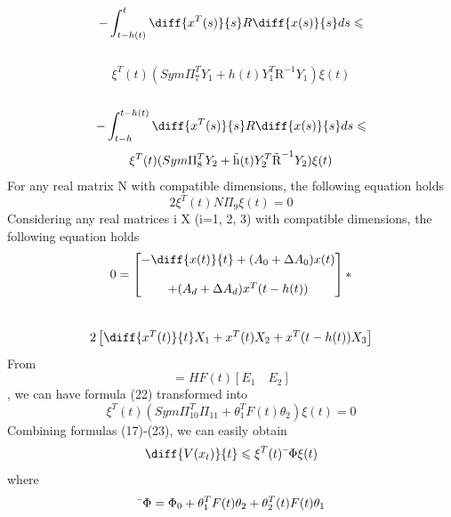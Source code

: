 \documentclass[journal]{IEEEtran}
\begin{document}
\begin{equation}
 -\int^{t}_{t-h(t)}\diff{x^T(s)}{s}R\diff{x(s)}{s}ds \leqslant 
\end{equation}
\\
\begin{equation}
\xi ^T (t)(Sym{\Pi^{T}_{7}Y_1} + h(t)Y^{T}_{1}\text{\~{R}}^{-1}Y_1)\xi (t)
\end{equation}
\\
\begin{equation}
-\int^{t-h(t)}_{t-h}\diff{x^T(s)}{s}R\diff{x(s)}{s}ds \leqslant 
\end{equation}
\begin{equation}
\xi ^T (t)(Sym{\Pi^{T}_{8}Y_2} +\text{\~{h(t)}}Y^{T}_{2}\text{\~{R}}^{-1}Y_2)\xi (t)
\end{equation}
For any real matrix N with compatible dimensions, the following equation holds 
\begin{equation}
2\xi ^T (t)N\Pi_9\xi (t) = 0
\end{equation}
Considering any real matrices i X (i=1, 2, 3) with compatible dimensions, the following equation holds 
\begin{equation}
0 = 
\begin{bmatrix}
-\diff{x(t)}{t} + (A_0 + \Delta{A_0})x(t) \\ \\
+(A_d + \Delta{A_d})x^T(t - h(t)) 
\end{bmatrix}
*
\end{equation}
\\
\begin{equation}
2
\begin{bmatrix}
\diff{x^T(t)}{t}X_1 + x^T(t)X_2 + x^T(t - h(t))X_3
\end{bmatrix}
\end{equation}
From
\begin{equation}
[\Delta{A_0} \quad \Delta{A_d}] = HF(t)[E_1 \quad E_2]
\end{equation} 
, we can have formula (22) transformed into
\begin{equation}
\xi ^T (t)(Sym{\Pi^{T}_{10}\Pi_{11} + \theta^{T}_{1}F(t)\theta_2})\xi (t) = 0
\end{equation}
Combining formulas (17)-(23), we can easily obtain  
\begin{equation}
\diff{V(x_t)}{t}  \leqslant \xi ^T (t)\text{\={$\Phi$}}\xi(t)
\end{equation}
where
\begin{equation}
\text{\={$\Phi$}} = \Phi_0 + \theta^{T}_{1}F(t)\theta_2   +   \theta^{T}_{2}(t)F(t)\theta_1
\end{equation}
\end{document}
